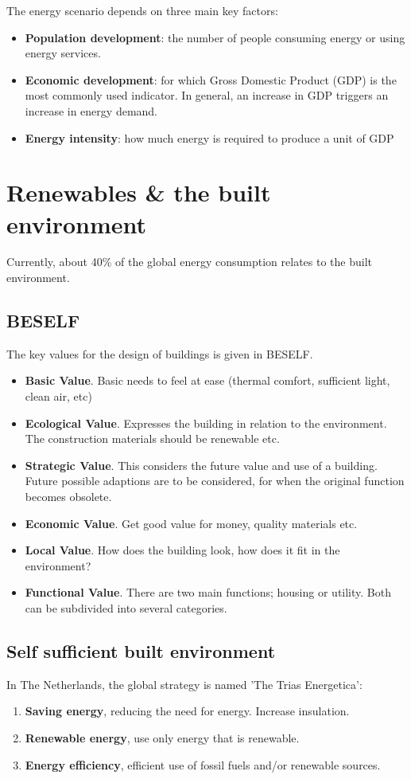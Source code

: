 \documentclass[a4paper,10pt]{article}
\begin{document}
The energy scenario depends on three main key factors:
\begin{itemize}
 \item \textbf{Population development}: the number of people consuming energy or using energy services.
 \item \textbf{Economic development}: for which Gross Domestic Product (GDP) is the most commonly used indicator. In general, an increase in GDP triggers an increase in energy demand.
 \item \textbf{Energy intensity}: how much energy is required to produce a unit of GDP
\end{itemize}



\section{Renewables \& the built environment}
Currently, about 40\% of the global energy consumption relates to the built environment.

\subsection{BESELF}
The key values for the design of buildings is given in BESELF.
\begin{itemize}
 \item \textbf{Basic Value}. Basic needs to feel at ease (thermal comfort, sufficient light, clean air, etc)
 \item \textbf{Ecological Value}. Expresses the building in relation to the environment. The construction materials should be renewable etc.
 \item \textbf{Strategic Value}. This considers the future value and use of a building. Future possible adaptions are to be considered, for when the original function becomes obsolete.
 \item \textbf{Economic Value}. Get good value for money, quality materials etc.
 \item \textbf{Local Value}. How does the building look, how does it fit in the environment?
 \item \textbf{Functional Value}. There are two main functions; housing or utility. Both can be subdivided into several categories.
\end{itemize}

\subsection{Self sufficient built environment}
In The Netherlands, the global strategy is named 'The Trias Energetica':
\begin{enumerate}
 \item \textbf{Saving energy}, reducing the need for energy. Increase insulation.
 \item \textbf{Renewable energy}, use only energy that is renewable.
 \item \textbf{Energy efficiency}, efficient use of fossil fuels and/or renewable sources.
\end{enumerate}
\end{document}
